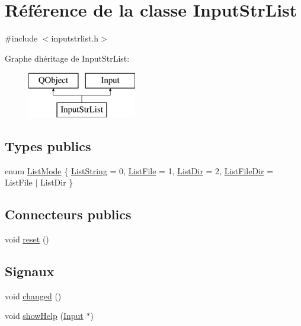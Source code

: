 \hypertarget{class_input_str_list}{}\section{Référence de la classe Input\+Str\+List}
\label{class_input_str_list}


{\ttfamily \#include $<$inputstrlist.\+h$>$}

Graphe d\textquotesingle{}héritage de Input\+Str\+List\+:\begin{figure}[H]
\begin{center}
\leavevmode
\includegraphics[height=2.000000cm]{class_input_str_list}
\end{center}
\end{figure}
\subsection*{Types publics}
\begin{DoxyCompactItemize}
\item 
enum \hyperlink{class_input_str_list_a8f78ed184bdeaa050c24608ad4a05833}{List\+Mode} \{ \hyperlink{class_input_str_list_a8f78ed184bdeaa050c24608ad4a05833ae092ee99b44bb7e83c1d52f42b741656}{List\+String} = 0, 
\hyperlink{class_input_str_list_a8f78ed184bdeaa050c24608ad4a05833a02a7d272457d107d74b7d0cdea3c538e}{List\+File} = 1, 
\hyperlink{class_input_str_list_a8f78ed184bdeaa050c24608ad4a05833ac8a28dbb90f0c43aea29f539a251f832}{List\+Dir} = 2, 
\hyperlink{class_input_str_list_a8f78ed184bdeaa050c24608ad4a05833a5c25631877d902ec246089cfb794bfe1}{List\+File\+Dir} = List\+File $\vert$ List\+Dir
 \}
\end{DoxyCompactItemize}
\subsection*{Connecteurs publics}
\begin{DoxyCompactItemize}
\item 
void \hyperlink{class_input_str_list_a9b8a78f1b4a3ae2d5c047b4fe89570b7}{reset} ()
\end{DoxyCompactItemize}
\subsection*{Signaux}
\begin{DoxyCompactItemize}
\item 
void \hyperlink{class_input_str_list_abbfc0dffb1bb70988e08b373678768a3}{changed} ()
\item 
void \hyperlink{class_input_str_list_a34ce8ee59c4fc4a6717821e9557e1116}{show\+Help} (\hyperlink{class_input}{Input} $\ast$)
\end{DoxyCompactItemize}
